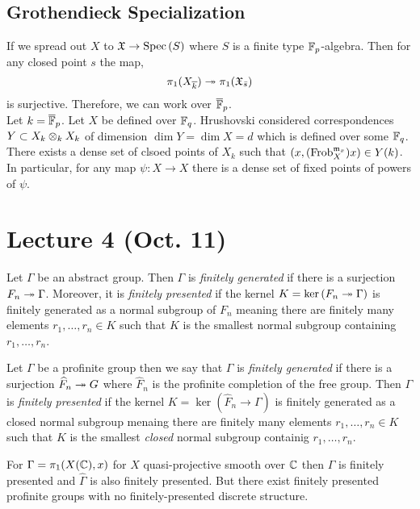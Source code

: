 \documentclass[12pt]{article}
\begin{document}
\subsection{Grothendieck Specialization}

If we spread out $X$ to $\mathfrak{X} \to \mathrm{Spec}\left( S \right)$ where $S$ is a finite type $\mathbb{F}_p$-algebra. Then for any closed point $s$ the map,
\[ \pi_1(X_{\overline{k}}) \twoheadrightarrow \pi_1(\mathfrak{X}_{\bar{s}}) \]
is surjective. Therefore, we can work over $\overline{\mathbb{F}}_p$.
\bigskip\\
Let $k = \overline{\mathbb{F}}_p$. Let $X$ be defined over $\mathbb{F}_q$. Hrushovski considered correspondences $Y \subset X_{k} \otimes_k X_k$ of dimension $\dim{Y} = \dim{X} = d$ which is defined over some $\mathbb{F}_q$. There exists a dense set of clsoed points of $X_{k}$ such that $(x, (\mathrm{Frob}_X^{\mathfrak{m}_x}) x) \in Y(k)$. 
\bigskip\\
In particular, for any map $\psi : X \to X$ there is a dense set of fixed points of powers of $\psi$. 

\section{Lecture 4 (Oct. 11)}

\begin{defn}
Let $\Gamma$ be an abstract group. Then $\Gamma$ is \textit{finitely generated} if there is a surjection $F_n \twoheadrightarrow \Gamma$. Moreover, it is \textit{finitely presented} if the kernel $K = \ker{(F_n \twoheadrightarrow\Gamma)}$ is finitely generated as a normal subgroup of $F_n$ meaning there are finitely many elements $r_1, \dots, r_n \in K$ such that $K$ is the smallest normal subgroup containing $r_1, \dots, r_n$.  
\end{defn}

\begin{defn}
Let $\Gamma$ be a profinite group then we say that $\Gamma$ is \textit{finitely generated} if there is a surjection $\widehat{F}_n \twoheadrightarrow G$ where $\widehat{F}_n$ is the profinite completion of the free group. Then $\Gamma$ is \textit{finitely presented} if the kernel $K = \ker{(\widehat{F}_n \to \Gamma)}$ is finitely generated as a closed normal subgroup menaing there are finitely many elements $r_1, \dots, r_n \in K$ such that $K$ is the smallest \textit{closed} normal subgroup containig $r_1, \dots, r_n$. 
\end{defn}

\begin{example}
For $\Gamma = \pi_1(X(\mathbb{C}), x)$ for $X$ quasi-projective smooth over $\mathbb{C}$ then $\Gamma$ is finitely presented and $\widehat{\Gamma}$ is also finitely presented. But there exist finitely presented profinite groups with no finitely-presented discrete structure.
\end{example}
\end{document}
